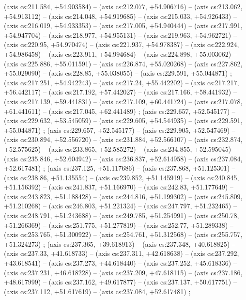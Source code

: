     (axis cs:211.584,    +54.903584) --  (axis cs:212.077,    +54.906716) --  (axis cs:213.062,    +54.913112) --  (axis cs:214.048,    +54.919685) --  (axis cs:215.033,    +54.926433) --  (axis cs:216.019,    +54.933353) --  (axis cs:217.005,    +54.940444) --  (axis cs:217.991,    +54.947704) --  (axis cs:218.977,    +54.955131) --  (axis cs:219.963,    +54.962721) --  (axis cs:220.95,    +54.970474) --  (axis cs:221.937,    +54.978387) --  (axis cs:222.924,    +54.986458) --  (axis cs:223.911,    +54.994684) --  (axis cs:224.898,    +55.003062) --  (axis cs:225.886,    +55.011591) --  (axis cs:226.874,    +55.020268) --  (axis cs:227.862,    +55.029090) --  (axis cs:228.85,    +55.038055) --  (axis cs:229.591,    +55.044871) ;
    (axis cs:217.251,    +54.942243) --  (axis cs:217.24,    +55.442202) --  (axis cs:217.217,    +56.442117) --  (axis cs:217.192,    +57.442027) --  (axis cs:217.166,    +58.441932) --  (axis cs:217.139,    +59.441831) --  (axis cs:217.109,    +60.441724) --  (axis cs:217.078,    +61.441611) --  (axis cs:217.045,    +62.441489) ;
    (axis cs:229.657,    +52.545177) --  (axis cs:229.632,    +53.545059) --  (axis cs:229.605,    +54.544935) --  (axis cs:229.591,    +55.044871) ;
    (axis cs:229.657,    +52.545177) --  (axis cs:229.905,    +52.547469) --  (axis cs:230.894,    +52.556720) --  (axis cs:231.884,    +52.566107) --  (axis cs:232.874,    +52.575625) --  (axis cs:233.865,    +52.585272) --  (axis cs:234.855,    +52.595045) --  (axis cs:235.846,    +52.604942) --  (axis cs:236.837,    +52.614958) --  (axis cs:237.084,    +52.617481) ;
    (axis cs:237.125,    +51.117686) --  (axis cs:237.868,    +51.125301) --  (axis cs:238.86,    +51.135554) --  (axis cs:239.852,    +51.145919) --  (axis cs:240.845,    +51.156392) --  (axis cs:241.837,    +51.166970) --  (axis cs:242.83,    +51.177649) --  (axis cs:243.823,    +51.188428) --  (axis cs:244.816,    +51.199302) --  (axis cs:245.809,    +51.210268) --  (axis cs:246.803,    +51.221324) --  (axis cs:247.797,    +51.232465) --  (axis cs:248.791,    +51.243688) --  (axis cs:249.785,    +51.254991) --  (axis cs:250.78,    +51.266369) --  (axis cs:251.775,    +51.277819) --  (axis cs:252.77,    +51.289338) --  (axis cs:253.765,    +51.300922) --  (axis cs:254.761,    +51.312568) --  (axis cs:255.757,    +51.324273) ;
    (axis cs:237.365,    +39.618913) --  (axis cs:237.348,    +40.618825) --  (axis cs:237.33,    +41.618733) --  (axis cs:237.311,    +42.618638) --  (axis cs:237.292,    +43.618541) --  (axis cs:237.273,    +44.618440) --  (axis cs:237.252,    +45.618336) --  (axis cs:237.231,    +46.618228) --  (axis cs:237.209,    +47.618115) --  (axis cs:237.186,    +48.617999) --  (axis cs:237.162,    +49.617877) --  (axis cs:237.137,    +50.617751) --  (axis cs:237.112,    +51.617619) --  (axis cs:237.084,    +52.617481) ;

